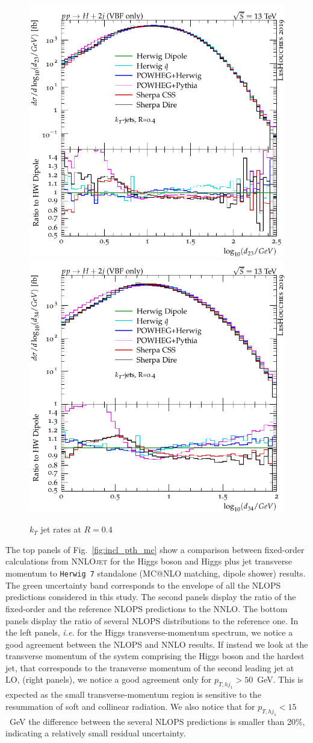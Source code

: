 \documentclass[10pt,prd,fleqn,superscriptaddress,notitlepage,nofootinbib,preprintnumbers,nobalancelastpage]{revtex4-1}
\newcommand{\NNLOJET}{\textsc{NNLOjet}\xspace}
\newcommand{\HW}{\texttt{Herwig 7}\xspace}
\begin{document}
\label{sec:resum}
\begin{figure}[tp]
  \centering
  \includegraphics[width=.475\textwidth]{figures/tools/d23.pdf}\hfill
  \includegraphics[width=.475\textwidth]{figures/tools/d34.pdf}
\caption{$k_T$ jet rates at $R=0.4$}
\label{fig:kt_jet_rates}
\end{figure}

The top panels of Fig.~\ref{fig:incl_pth_mc} show a comparison between fixed-order calculations from \NNLOJET  for the Higgs boson and Higgs plus jet transverse momentum to \HW{} standalone (MC@NLO matching, dipole shower) results.
The green uncertainty band corresponds to the envelope of all the NLOPS predictions considered in this study. The second panels display the ratio of the fixed-order and the reference NLOPS predictions to the NNLO.
The bottom panels display the ratio of several NLOPS distributions to the reference one.
%
In the left panels, \emph{i.e.} for the Higgs transverse-momentum spectrum, we notice a good agreement between the NLOPS and NNLO results.
%
If instead we look at the transverse momentum of the system comprising the Higgs boson and the hardest jet, that corresponds to the transverse momentum of the second leading jet at LO, (right panels), we notice a good agreement only for $p_{T,hj_1}>50$~GeV. This is expected as the small transverse-momentum region is sensitive to the resummation of soft and collinear radiation. We also notice that for $p_{T,hj_1}<15$~GeV the difference between the several NLOPS predictions is smaller than 20\%, indicating a relatively small residual uncertainty.
\end{document}
